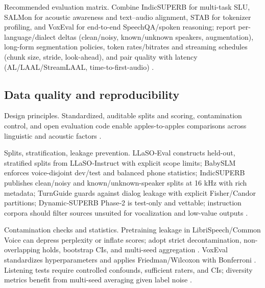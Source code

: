 Recommended evaluation matrix. Combine IndicSUPERB for multi-task SLU, SALMon for acoustic awareness and text–audio alignment, STAB for tokenizer profiling, and VoxEval for end-to-end SpeechQA/spoken reasoning; report per-language/dialect deltas (clean/noisy, known/unknown speakers, augmentation), long-form segmentation policies, token rates/bitrates and streaming schedules (chunk size, stride, look-ahead), and pair quality with latency (AL/LAAL/StreamLAAL, time-to-first-audio) \cite{entry2025indicsuperbspeechprocessinguniversalperf,maimon2025salmonsuiteacousticlanguagemodelevaluati,vashishth2024stabspeechtokenizerassessmentbenchmark,cui2025voxevalbenchmarkingknowledgeunderstandin,zhang2025impactframeratesspeechtokenizercasestudy}.

\subsection{Data quality and reproducibility} \label{subsec:Data quality and reproducibility}

Design principles. Standardized, auditable splits and scoring, contamination control, and open evaluation code enable apples-to-apples comparisons across linguistic and acoustic factors \cite{entry2025indicsuperbspeechprocessinguniversalperf,maimon2025salmonsuiteacousticlanguagemodelevaluati}.

Splits, stratification, leakage prevention. LLaSO‑Eval constructs held-out, stratified splits from LLaSO‑Instruct with explicit scope limits; BabySLM enforces voice-disjoint dev/test and balanced phone statistics; IndicSUPERB publishes clean/noisy and known/unknown-speaker splits at 16 kHz with rich metadata; TurnGuide guards against dialog leakage with explicit Fisher/Candor partitions; Dynamic‑SUPERB Phase‑2 is test-only and vettable; instruction corpora should filter sources unsuited for vocalization and low-value outputs \cite{sun2025llasofoundationalframeworkreproduciblere,lavechin2023babyslmlanguageacquisitionfriendlybenchm,cui2025thinkbeforeyoutalkenhancingmeaningfuldia,huang2025dynamicsuperbphase2collaborativelyexpand,shu2023llasmlargelanguagespeechmodel}.

Contamination checks and statistics. Pretraining leakage in LibriSpeech/Common Voice can depress perplexity or inflate scores; adopt strict decontamination, non-overlapping holds, bootstrap CIs, and multi-seed aggregation \cite{tseng2025evaluationllmsspeechisoftenflawedtestset}. VoxEval standardizes hyperparameters and applies Friedman/Wilcoxon with Bonferroni \cite{cui2025voxevalbenchmarkingknowledgeunderstandin}. Listening tests require controlled confounds, sufficient raters, and CIs; diversity metrics benefit from multi-seed averaging given label noise \cite{wang2024evaluatingtextspeechsynthesislargediscre,futeral2025madspeechmeasuresacousticdiversity}.

